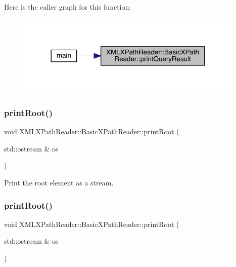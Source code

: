 Here is the caller graph for this function\+:
\nopagebreak
\begin{figure}[H]
\begin{center}
\leavevmode
\includegraphics[width=308pt]{d6/dbf/classXMLXPathReader_1_1BasicXPathReader_a719ba9bbd4ae77d6be9a6544a2d0ccaf_icgraph}
\end{center}
\end{figure}
\mbox{\label{classXMLXPathReader_1_1BasicXPathReader_abc0bfad898a5b01d2251d7aaacbbb507}} 
\subsubsection{\texorpdfstring{printRoot()}{printRoot()}\hspace{0.1cm}{\footnotesize\ttfamily [1/3]}}
{\footnotesize\ttfamily void X\+M\+L\+X\+Path\+Reader\+::\+Basic\+X\+Path\+Reader\+::print\+Root (\begin{DoxyParamCaption}\item[{std\+::ostream \&}]{os }\end{DoxyParamCaption})}



Print the root element as a stream. 

\mbox{\label{classXMLXPathReader_1_1BasicXPathReader_abc0bfad898a5b01d2251d7aaacbbb507}} 
\subsubsection{\texorpdfstring{printRoot()}{printRoot()}\hspace{0.1cm}{\footnotesize\ttfamily [2/3]}}
{\footnotesize\ttfamily void X\+M\+L\+X\+Path\+Reader\+::\+Basic\+X\+Path\+Reader\+::print\+Root (\begin{DoxyParamCaption}\item[{std\+::ostream \&}]{os }\end{DoxyParamCaption})}



